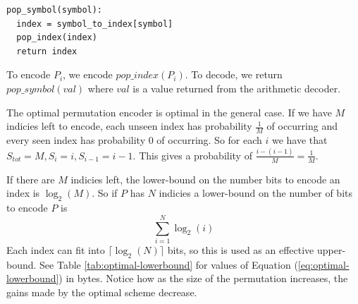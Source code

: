 \documentclass{report}
\begin{document}
\begin{verbatim}
pop_symbol(symbol):
  index = symbol_to_index[symbol]
  pop_index(index)
  return index
\end{verbatim}

To encode $P_i$, we encode $pop\_index(P_i)$. To decode, we return
$pop\_symbol(val)$ where $val$ is a value returned from the arithmetic
decoder.

The optimal permutation encoder is optimal in the general case. If we have $M$
indicies left to encode, each unseen index has probability $\frac{1}{M}$ of
occurring and every seen index has probability $0$ of occurring. So for each
$i$ we have that $S_{tot}=M, S_i = i, S_{i-1} = i-1$. This gives a probability
of $\frac{i-(i-1)}{M} = \frac{1}{M}$.

If there are $M$ indicies left, the lower-bound on the number bits to encode
an index is $\log_2(M)$. So if $P$ has $N$ indicies a lower-bound on the
number of bits to encode $P$ is
\begin{equation}
  \displaystyle\sum^{N}_{i=1} \log_2(i)
  \label{eq:optimal-lowerbound}
\end{equation}
Each index can fit into $\lceil\log_2(N)\rceil$ bits, so this is used as an
effective upper-bound. See Table \ref{tab:optimal-lowerbound} for values of
Equation (\ref{eq:optimal-lowerbound}) in bytes. Notice how as the size of the
permutation increases, the gains made by the optimal scheme decrease.


\begin{table}
  \center
  \caption{Number of bytes needed for storing permutations of different
    sizes. See Equation (\ref{eq:optimal-lowerbound}) for the lower bound. The
    effective upper-bound is
    $\lceil\log_2(N)\rceil/8$} \label{tab:optimal-lowerbound}
\end{table}
\end{document}
